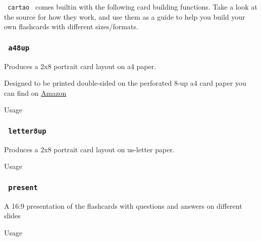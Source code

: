 \texttt{\ cartao\ } comes builtin with the following card building
functions. Take a look at the source for how they work, and use them as
a guide to help you build your own flashcards with different
sizes/formats.

\subsubsection{\texorpdfstring{\texttt{\ a48up\ }}{ a48up }}\label{a48up}

Produces a 2x8 portrait card layout on a4 paper.

Designed to be printed double-sided on the perforated 8-up a4 card paper
you can find on
\href{https://www.amazon.ca/s?k=a4+perforated+card&crid=37RT2L4H5XSD0&sprefix=a4+perforated+ca\%2Caps\%2C648&ref=nb_sb_noss}{Amazon}

Usage

\begin{Shaded}
\begin{Highlighting}[]
\end{Highlighting}
\end{Shaded}

\subsubsection{\texorpdfstring{\texttt{\ letter8up\ }}{ letter8up }}\label{letter8up}

Produces a 2x8 portrait card layout on us-letter paper.

Usage

\begin{Shaded}
\begin{Highlighting}[]
\end{Highlighting}
\end{Shaded}

\subsubsection{\texorpdfstring{\texttt{\ present\ }}{ present }}\label{present}

A 16:9 presentation of the flashcards with questions and answers on
different slides

Usage

\begin{Shaded}
\begin{Highlighting}[]
\end{Highlighting}
\end{Shaded}

